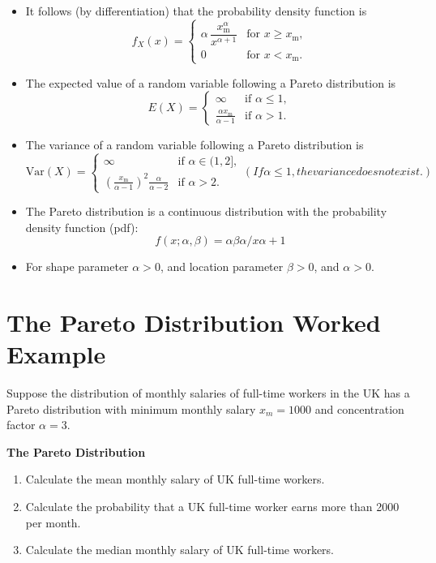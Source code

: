 \documentclass[]{report}
\begin{document}
{{\begin{itemize}
\item It follows (by differentiation) that the probability density function is
\[
f_X(x)= \begin{cases} \alpha\,\dfrac{x_\mathrm{m}^\alpha}{x^{\alpha+1}} & \mbox{for }x \ge x_\mathrm{m}, \\[12pt] 0 & \mbox{for } x < x_\mathrm{m}. \end{cases} 
\]

\item The expected value of a random variable following a Pareto distribution is
\[
E(X)= \begin{cases} \infty & \mbox{if }\alpha\le 1, \\ \frac{\alpha x_\mathrm{m}}{\alpha-1} & \mbox{if }\alpha>1. \end{cases}
\]


\item The variance of a random variable following a Pareto distribution is
\[
\mathrm{Var}(X)= \begin{cases} \infty & \mbox{if }\alpha\in(1,2], \\ \left(\frac{x_\mathrm{m}}{\alpha-1}\right)^2 \frac{\alpha}{\alpha-2} & \mbox{if }\alpha>2. \end{cases}
(If \alpha\le 1, the variance does not exist.)
\]



\item The Pareto distribution is 
a continuous distribution with the probability density function (pdf):
\[
f(x; \alpha, \beta) = \alpha\beta\alpha / x\alpha+ 1
\]
\item For shape parameter $\alpha > 0$, and location parameter $\beta > 0$, and $\alpha > 0$.
\end{itemize}




\section{The Pareto Distribution Worked Example}

Suppose the distribution of monthly salaries of full-time workers in the UK has
a Pareto distribution with minimum monthly salary $x_m = 1000$ and concentration
factor $\alpha = 3$. 

\noindent \textbf{The Pareto Distribution}

\begin{enumerate}
\item Calculate the mean monthly salary of UK full-time workers.
\item Calculate the probability that a UK full-time worker earns more than 2000 per month.
\item Calculate the median monthly salary of UK full-time workers.
\end{enumerate}

}}
\end{document}
